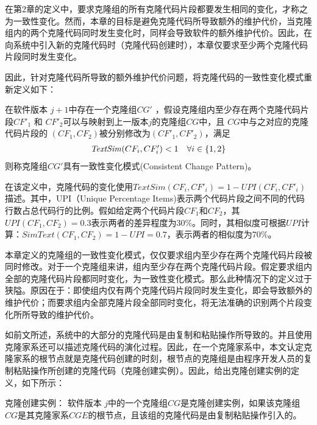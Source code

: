 在第2章的定义中，要求克隆组的所有克隆代码片段都要发生相同的变化，才称之为一致性变化。然而，本章的目标是避免克隆代码所导致额外的维护代价，当克隆组内的两个克隆代码同时发生变化时，同样会导致软件的额外维护代价。因此，在向系统中引入新的克隆代码时（克隆代码创建时），本章仅要求至少两个克隆代码片段同时发生变化。

因此，针对克隆代码所导致的额外维护代价问题，将克隆代码的一致性变化模式重新定义如下：

\begin{definition}[克隆创建一致性变化模式] 
\label{def-creatingpattern}
在软件版本 $j+1$中存在一个克隆组$CG'$ ，假设克隆组内至少存在两个克隆代码片段$CF'_1$ 和 $CF'_2$可以与映射到上一版本$j$的克隆组$CG$中，且 $CG$中与之对应的克隆代码片段的 $(CF_1,CF_2)$被分别修改为$(CF'_1,CF'_2)$，满足
  \[
  \begin{array}[t]{cr}
    \mathit{TextSim}(CF_i, CF'_i) < 1 & \forall i \in \{1,2\}  \\
  \end{array}
  \]
则称克隆组$CG'$具有一致性变化模式(Consistent Change Pattern)。
\end{definition}

在该定义中，克隆代码的变化使用$\mathit{TextSim}(CF_i, CF'_i)= 1 - UPI(CF_i, CF'_i)$描述。其中，UPI（Unique Percentage Items\cite{roy2008nicad})表示两个代码片段之间不同的代码行数占总代码行的比例。假如给定两个代码片段$CF_1$和$CF_2$，其$UPI(CF_1,CF_2)=0.3$表示两者的差异程度为30\%。同时，其相似度可根据$UPI$计算：$SimText (CF_1,CF_2)=1-UPI=0.7$，表示两者的相似度为70\%。

本章定义的克隆组的一致性变化模式，仅仅要求组内至少存在两个克隆代码片段被同时修改。对于一个克隆组来讲，组内至少存在两个克隆代码片段。假定要求组内全部的克隆代码片段都同时变化，为一致性变化模式。那么此种情况下的定义过于狭隘。原因在于：即使组内仅有两个克隆代码片段同时发生变化，即会导致额外的维护代价；而要求组内全部克隆片段全部同时变化，将无法准确的识别两个片段变化所所导致的维护代价。

如前文所述，系统中的大部分的克隆代码是由复制和粘贴操作所导致的。并且使用克隆家系还可以描述克隆代码的演化过程。因此，在一个克隆家系中，本文认定克隆家系的根节点就是克隆代码创建的时刻，根节点的克隆组是由程序开发人员的复制粘贴操作所创建的克隆代码（克隆创建实例）。因此，给出克隆创建实例的定义，如下所示：

\begin{definition}[克隆创建实例] 
\label{def-creatinginstance}
克隆创建实例：
软件版本 $j$中的一个克隆组$CG$是克隆创建实例，如果该克隆组$CG$是其克隆家系$CGE$的根节点，且该组的克隆代码是由复制粘贴操作引入的。
\end{definition}


